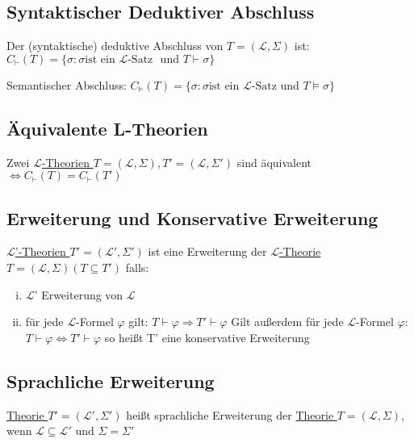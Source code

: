 \documentclass[12pt,a4paper]{article} %
\begin{document}
	\subsection{Syntaktischer Deduktiver Abschluss}
	Der (syntaktische) deduktive Abschluss von $T = (\mathcal{L}, \Sigma)$ ist: \newline 
	$C_{\vdash}(T) = \{\sigma : \sigma \text{ist ein } \hyperref[LSatz]{\mathcal{L} \text{-Satz }} \text{ und } T \hyperref[Beweisbar]{\vdash} \sigma\}$
	
	Semantischer Abschluss: \newline
	$C_{\vDash}(T) = \{\sigma : \sigma \text{ist ein } \hyperref[LSatz]{\mathcal{L} \text{-Satz}} \text{ und } T \hyperref[Erfullbar]{\vDash} \sigma\}$
	
	\subsection{Äquivalente L-Theorien}
	Zwei \hyperref[Theorie]{$\mathcal{L}$-Theorien $T = (\mathcal{L}, \Sigma), T' = (\mathcal{L}, \Sigma')$} sind äquivalent $\Leftrightarrow C_{\vdash}(T) = C_{\vdash}(T')$
	
	\subsection{Erweiterung und Konservative Erweiterung}
	\label{Erweiterung}
	\hyperref[Theorie]{$\mathcal{L}$'-Theorien $T' = (\mathcal{L}', \Sigma')$} ist eine Erweiterung der \hyperref[Theorie]{$\mathcal{L}$-Theorie $T = (\mathcal{L}, \Sigma) (T \subseteq T')$} falls:
	\begin{enumerate}[(i)]
		\item $\mathcal{L}$' Erweiterung von $\mathcal{L}$
		\item für jede $\mathcal{L}$-Formel $\varphi$ gilt: $T \hyperref[Beweisbar]{\vdash} \varphi \Rightarrow T' \hyperref[Beweisbar]{\vdash} \varphi$ \newline
		Gilt außerdem für jede $\mathcal{L}$-Formel $\varphi$: $T \hyperref[Beweisbar]{\vdash} \varphi \Leftrightarrow T' \hyperref[Beweisbar]{\vdash} \varphi$ so heißt T' eine konservative Erweiterung
	\end{enumerate}

	\subsection{Sprachliche Erweiterung}
	\label{SprachlicheErweiterung}
	\hyperref[Theorie]{Theorie $T' = (\mathcal{L}', \Sigma')$} heißt sprachliche Erweiterung der \hyperref[Theorie]{Theorie $T = (\mathcal{L}, \Sigma)$}, wenn $\mathcal{L} \subseteq \mathcal{L}'$ und $\Sigma = \Sigma'$
	
\end{document}
